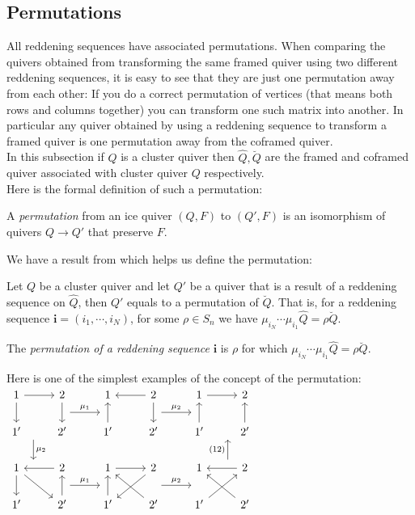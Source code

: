 \subsection{Permutations}
\indent All reddening sequences have associated permutations. When comparing the quivers obtained from transforming the same framed quiver using two different reddening sequences, it is easy to see that they are just one permutation away from each other: If you do a correct permutation of vertices (that means both rows and columns together) you can transform one such matrix into another. In particular any quiver obtained by using a reddening sequence to transform a framed quiver is one permutation away from the coframed quiver.\\
\indent In this subsection if $Q$ is a cluster quiver then $\hat{Q}, \breve{Q}$ are the framed and coframed quiver associated with cluster quiver $Q$ respectively.\\
\indent Here is the formal definition of such a permutation:\\
\begin{definition}
\cite{BDP13} A \textit{permutation} from an ice quiver $(Q,F)$ to $(Q',F)$ is an isomorphism of quivers $Q\rightarrow Q'$ that preserve $F$.\\
\end{definition}
\indent We have a result from \cite{BDP13} which helps us define the permutation:\\
\begin{theorem}
\cite{BDP13} Let $Q$ be a cluster quiver and let $Q'$ be a quiver that is a result of a reddening sequence on $\hat{Q}$, then  $Q'$ equals to a permutation of $\breve{Q}$. That is, for a reddening sequence $\mathbf{i}=(i_1,\cdots, i_N)$, for some $\rho\in S_n$ we have $\mu_{i_N}\cdots\mu_{i_1}\hat{Q}=\rho\breve{Q}$.\\
\end{theorem}
\begin{definition}
\cite{GM14} The \textit{permutation of a reddening sequence} $\mathbf{i}$ is $\rho$ for which $\mu_{i_N}\cdots\mu_{i_1}\hat{Q}=\rho\breve{Q}$.\\
\end{definition}
\indent Here is one of the simplest examples of the concept of the permutation:\\
$\begin{tikzcd}
1 \arrow[r] \arrow[d] & 2\arrow [d]\arrow[r,"\mu_1", shift right=3.5ex]  & 1&2\arrow[l]\arrow[d]\arrow[r,"\mu_2", shift right=3.5ex]&1\arrow[r] & 2\\
1' \arrow[d,"\mu_2", shift left=3.5ex]& 2'&1'\arrow[u]& 2'&1'\arrow[u] & 2'\arrow[u]\\
 1\arrow[d]\arrow[dr]&2\arrow[l]\arrow[r,"\mu_1", shift right=3.5ex]&1\arrow[r]&2\arrow[dl]\arrow[r,"\mu_2", shift right=3.5ex]&1&2\arrow[l]\arrow[u,"(12)", shift left=3.5ex]\\
 1'&2'\arrow[u]&1'\arrow[u]&2'\arrow[ul]&1'\arrow[ur]&2'\arrow[ul]\\
\end{tikzcd}$\\
